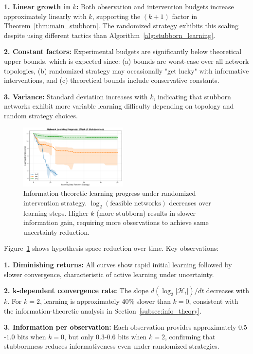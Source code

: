 \documentclass[conference]{IEEEtran}
\begin{document}
\textbf{1. Linear growth in $k$:} Both observation and intervention budgets increase approximately linearly with $k$, supporting the $(k+1)$ factor in Theorem~\ref{thm:main_stubborn}. The randomized strategy exhibits this scaling despite using different tactics than Algorithm~\ref{alg:stubborn_learning}.

\textbf{2. Constant factors:} Experimental budgets are significantly below theoretical upper bounds, which is expected since: (a) bounds are worst-case over all network topologies, (b) randomized strategy may occasionally "get lucky" with informative interventions, and (c) theoretical bounds include conservative constants.

\textbf{3. Variance:} Standard deviation increases with $k$, indicating that stubborn networks exhibit more variable learning difficulty depending on topology and random strategy choices.

\begin{figure}[t]
\centering
\includegraphics[width=0.48\textwidth]{learning_progress.png}
\caption{Information-theoretic learning progress under randomized intervention strategy. $\log_2(\text{feasible networks})$ decreases over learning steps. Higher $k$ (more stubborn) results in slower information gain, requiring more observations to achieve same uncertainty reduction.}
\label{fig:progress}
\end{figure}

Figure~\ref{fig:progress} shows hypothesis space reduction over time. Key observations:

\textbf{1. Diminishing returns:} All curves show rapid initial learning followed by slower convergence, characteristic of active learning under uncertainty.

\textbf{2. k-dependent convergence rate:} The slope $d(\log_2|\mathcal{H}_t|)/dt$ decreases with $k$. For $k=2$, learning is approximately 40\% slower than $k=0$, consistent with the information-theoretic analysis in Section~\ref{subsec:info_theory}.

\textbf{3. Information per observation:} Each observation provides approximately $0.5$-$1.0$ bits when $k=0$, but only $0.3$-$0.6$ bits when $k=2$, confirming that stubbornness reduces informativeness even under randomized strategies.
\end{document}
